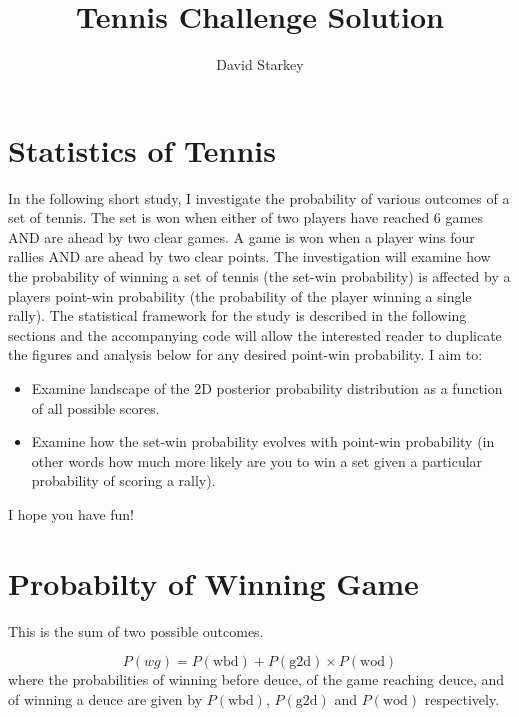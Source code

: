 \documentclass[10pt]{article}
\begin{document}
\title{Tennis Challenge Solution}

\author{David Starkey}

\maketitle


\section{Statistics of Tennis}
In the following short study, I investigate the probability of various outcomes of a set of tennis. The set is won when either of two players have reached 6 games AND are ahead by two clear games. A game is won when a player wins four rallies AND are ahead by two clear points. The investigation will examine how the probability of winning a set of tennis (the set-win probability) is affected by a players point-win probability (the probability of the player winning a single rally). The statistical framework for the study is described in the following sections and the accompanying code will allow the interested reader to duplicate the figures and analysis below for any desired point-win probability. I aim to:

\begin{itemize}
\item Examine landscape of the 2D posterior probability distribution as a function of all possible scores.

\item Examine how the set-win probability evolves with point-win probability (in other words how much more likely are you to win a set given a particular probability of scoring a rally). 

\end{itemize}

I hope you have fun!

\section{Probabilty of Winning Game}
This is the sum of two possible outcomes.

\begin{equation}
\label{eq_pwg}
P(wg) = P( \mathrm{wbd} ) + P( \mathrm{g2d} ) \times P(\mathrm{wod})
\end{equation}
\noindent where the probabilities of winning before deuce, of the game reaching deuce, and of winning a deuce are given by $P( \mathrm{wbd} )$, $P( \mathrm{g2d} )$ and $P(\mathrm{wod})$ respectively.
\end{document}
